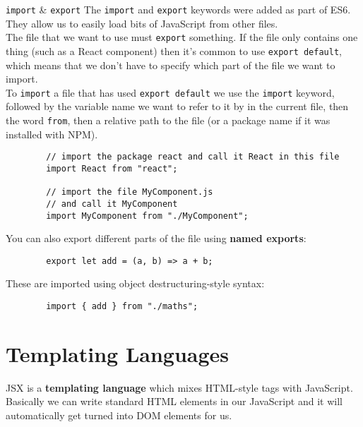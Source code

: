 \begin{infobox}{\texttt{import} \& \texttt{export}}
    The \texttt{import} and \texttt{export} keywords were added as part of ES6. They allow us to easily load bits of JavaScript from other files.
    \\

    The file that we want to use must \texttt{export} something. If the file only contains one thing (such as a React component) then it's common to use \texttt{export default}, which means that we don't have to specify which part of the file we want to import.
    \\

    To \texttt{import} a file that has used \texttt{export default} we use the \texttt{import} keyword, followed by the variable name we want to refer to it by in the current file, then the word \texttt{from}, then a relative path to the file (or a package name if it was installed with NPM).

    \begin{verbatim}
        // import the package react and call it React in this file
        import React from "react";

        // import the file MyComponent.js
        // and call it MyComponent
        import MyComponent from "./MyComponent";
    \end{verbatim}

    You can also export different parts of the file using \textbf{named exports}:

    \begin{verbatim}
        export let add = (a, b) => a + b;
    \end{verbatim}

    These are imported using object destructuring-style syntax:

    \begin{verbatim}
        import { add } from "./maths";
    \end{verbatim}
\end{infobox}


\section{Templating Languages}

JSX is a \textbf{templating language} which mixes HTML-style tags with JavaScript. Basically we can write standard HTML elements in our JavaScript and it will automatically get turned into DOM elements for us.
\\

